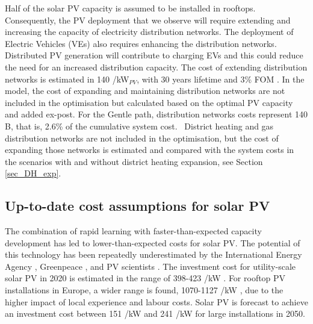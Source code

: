 \documentclass[3p]{elsarticle} %
\begin{document}
Half of the solar PV capacity is assumed to be installed in rooftops. Consequently, the PV deployment that we observe will require extending and increasing the capacity of electricity distribution networks. The deployment of Electric Vehicles (VEs) also requires enhancing the distribution networks. Distributed PV generation will contribute to charging EVs and this could reduce the need for an increased distribution capacity. The cost of extending distribution networks is estimated in 140 \EUR/kW$_{PV}$, with 30 years lifetime and 3\% FOM \cite{Sterchele_2020, DEA_2019}. In the model, the cost of expanding and maintaining distribution networks are not included in the optimisation but calculated based on the optimal PV capacity and added ex-post. For the Gentle path, distribution networks costs represent 140 B\EUR, that is, 2.6\% of the cumulative system cost.  \
District heating and gas distribution networks are not included in the optimisation, but the cost of expanding those networks is estimated and compared with the system costs in the scenarios with and without district heating expansion, see Section \ref{sec_DH_exp}. 

\subsection{Up-to-date cost assumptions for solar PV} 

The combination of rapid learning with faster-than-expected capacity development has led to lower-than-expected costs for solar PV. The potential of this technology has been repeatedly underestimated by the International Energy Agency \cite{Fell_2015}, Greenpeace \cite{Creutzig_2017}, and PV scientists \cite{Haegel_2019}. The investment cost for utility-scale solar PV in 2020 is estimated in the range of 398-423 \EUR/kW \cite{Vartiainen_2017, DEA_2019}. For rooftop PV installations in Europe, a wider range is found, 1070-1127 \EUR/kW \cite{DEA_2019, Fraunhofer, Vartiainen_2017}, due to the higher impact of local experience and labour costs. Solar PV is forecast to achieve an investment cost between 151 \EUR/kW \cite{Vartiainen_2019} and 241 \EUR/kW  \cite{DEA_2019} for large installations in 2050. \\
\end{document}
